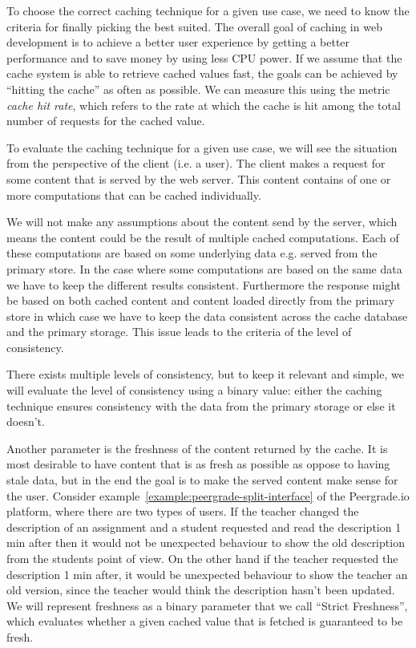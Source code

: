 
To choose the correct caching technique for a given use case, we need to know the criteria for finally picking the best suited. The overall goal of caching in web development is to achieve a better user experience by getting a better performance and to save money by using less CPU power. If we assume that the cache system is able to retrieve cached values fast, the goals can be achieved by ``hitting the cache'' as often as possible. We can measure this using the metric \emph{cache hit rate}, which refers to the rate at which the cache is hit among the total number of requests for the cached value.



To evaluate the caching technique for a given use case, we will see the situation from the perspective of the client (i.e. a user). The client makes a request for some content that is served by the web server. This content contains of one or more computations that can be cached individually.


We will not make any assumptions about the content send by the server, which means the content could be the result of multiple cached computations. Each of these computations are based on some underlying data e.g. served from the primary store. In the case where some computations are based on the same data we have to keep the different results consistent. Furthermore the response might be based on both cached content and content loaded directly from the primary store in which case we have to keep the data consistent across the cache database and the primary storage. This issue leads to the criteria of the level of consistency.

There exists multiple levels of consistency, but to keep it relevant and simple, we will evaluate the level of consistency using a binary value: either the caching technique ensures consistency with the data from the primary storage or else it doesn't.


Another parameter is the freshness of the content returned by the cache. It is most desirable to have content that is as fresh as possible as oppose to having stale data, but in the end the goal is to make the served content make sense for the user. Consider example~\ref{example:peergrade-split-interface} of the Peergrade.io platform, where there are two types of users. If the teacher changed the description of an assignment and a student requested and read the description 1 min after then it would not be unexpected behaviour to show the old description from the students point of view. On the other hand if the teacher requested the description 1 min after, it would be unexpected behaviour to show the teacher an old version, since the teacher would think the description hasn't been updated. We will represent freshness as a binary parameter that we call ``Strict Freshness'', which evaluates whether a given cached value that is fetched is guaranteed to be fresh.


